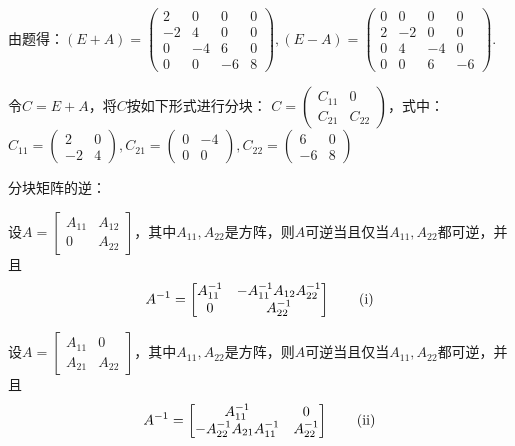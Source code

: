 \documentclass[a4paper]{report}
\begin{document}
\begin{jie}
由题得：$(E+A)=
\begin{pmatrix}
2&0&0&0\\
-2&4&0&0\\
0&-4&6&0\\
0&0&-6&8
\end{pmatrix},(E-A)=
\begin{pmatrix}
0&0&0&0\\
2&-2&0&0\\
0&4&-4&0\\
0&0&6&-6
\end{pmatrix}
$.

令$C=E+A$，将$C$按如下形式进行分块：
$
C=
\begin{pmatrix}
C_{11}&0\\
C_{21}&C_{22}
\end{pmatrix}
$，式中：$
C_{11}=
\begin{pmatrix}
2&0\\ -2&4
\end{pmatrix},C_{21}=
\begin{pmatrix}
0&-4\\ 0&0
\end{pmatrix},C_{22}=
\begin{pmatrix}
6&0\\ -6&8
\end{pmatrix}
$

\begin{tips}
分块矩阵的逆：

设$A=
\begin{bmatrix}
  A_{11} & A_{12} \\
  0 & A_{22}
\end{bmatrix}
$，其中$A_{11},A_{22}$是方阵，则$A$可逆当且仅当$A_{11},A_{22}$都可逆，并且
\begin{equation*}
A^{-1}=
  \begin{bmatrix}
    A_{11}^{-1} & -A_{11}^{-1}A_{12}A_{22}^{-1} \\
    0 & A_{22}^{-1}
  \end{bmatrix}\tag{\uppercase\expandafter{\romannumeral1}}
\end{equation*}

设$A=
\begin{bmatrix}
  A_{11} & 0 \\
  A_{21} & A_{22}
\end{bmatrix}
$，其中$A_{11},A_{22}$是方阵，则$A$可逆当且仅当$A_{11},A_{22}$都可逆，并且
\begin{equation*}
A^{-1}=
  \begin{bmatrix}
    A_{11}^{-1} & 0 \\
    -A_{22}^{-1}A_{21}A_{11}^{-1} & A_{22}^{-1}
  \end{bmatrix}\tag{\uppercase\expandafter{\romannumeral2}}
\end{equation*}
\hphantom{~}
\end{tips}


\end{jie}
\end{document}
